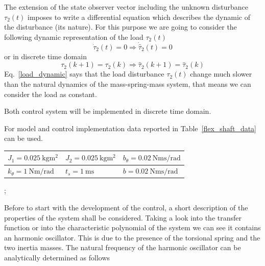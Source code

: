 \documentclass[11pt,a4paper,oneside]{book}
\numberwithin{equation}{section}
\theoremstyle{it}
\theoremstyle{definition}
\begin{document}
The extension of the state observer vector including the unknown disturbance 
$\tau_2(t)$ imposes to write a differential equation which describes the 
dynamic of the disturbance (its nature). For this purpose we are going to 
consider the following dynamic representation of the load $\tau_2(t)$ 
\begin{equation}\label{load_dynamic}
	\dot{\tau}_2(t)=0 \Rightarrow \dot{\hat{\tau}}_2(t)=0 
\end{equation}
or in discrete time domain
\begin{equation}
	\tau_2(k+1)=\tau_2(k)\Rightarrow\hat{\tau}_2(k+1)=\hat{\tau}_2(k)
\end{equation}
Eq.~\eqref{load_dynamic} says that the load disturbance $\tau_2(t)$ change much 
slower than the natural dynamics of the mass-spring-mass system, that means we 
can consider the load as constant.

Both control system will be implemented in discrete time domain.

For model and control implementation data reported in Table~\ref{flex_shaft_data} can be used.
\begin{center}
	\setlength{\extrarowheight}{6pt}
	\begin{tabular}{ | m{10em} | m{10em} | m{10em} |}
		\hline
		$J_1 = \SI{0.025}{\kilogram\square\meter}$ & $J_2 = 
		\SI{0.025}{\kilogram\square\meter}$ & $b_{\theta} = 
		\SI{0.02}{\newton\meter\second\per\radian}$ \\[6pt]
		\hline
		$k_{\theta} = \SI{1}{\newton\meter\per\radian}$ & 
		$t_s = \SI{1}{\milli\second}$ &  $b = 
		\SI{0.02}{\newton\meter\second\per\radian}$ \\[6pt]
		\hline
	\end{tabular}
	\captionsetup{width=0.5\textwidth, font=small};	
	\label{flex_shaft_data}
\end{center}




Before to start with the development of the control, a short description of the properties of the system shall be considered. Taking a look into the transfer function or into the characteristic polynomial of the system we can see it contains an harmonic oscillator. This is due to the presence of the torsional spring and the two inertia masses. The natural frequency of the harmonic oscillator can be analytically determined as follows
\end{document}
